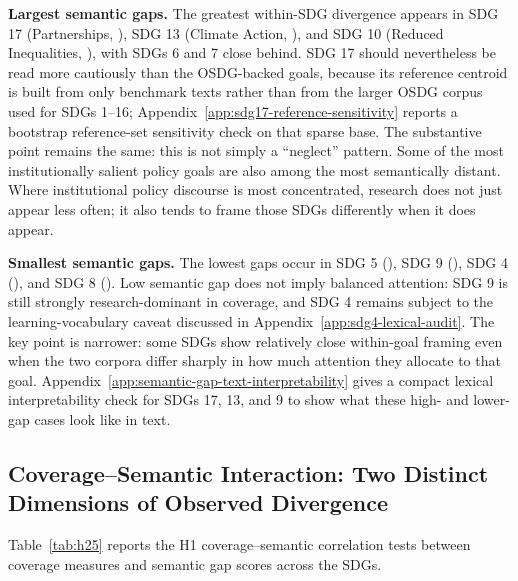 \documentclass[12pt,a4paper]{article}
\begin{document}
\textbf{Largest semantic gaps.} The greatest within-SDG divergence appears in SDG 17 (Partnerships, \SemanticGapSdgSeventeen), SDG 13 (Climate Action, \SemanticGapSdgThirteen), and SDG 10 (Reduced Inequalities, \SemanticGapSdgTen), with SDGs 6 and 7 close behind. SDG 17 should nevertheless be read more cautiously than the OSDG-backed goals, because its reference centroid is built from only \SdgSeventeenBenchmarkN{} benchmark texts rather than from the larger OSDG corpus used for SDGs 1--16; Appendix~\ref{app:sdg17-reference-sensitivity} reports a bootstrap reference-set sensitivity check on that sparse base. The substantive point remains the same: this is not simply a ``neglect'' pattern. Some of the most institutionally salient policy goals are also among the most semantically distant. Where institutional policy discourse is most concentrated, research does not just appear less often; it also tends to frame those SDGs differently when it does appear.

\textbf{Smallest semantic gaps.} The lowest gaps occur in SDG 5 (\SemanticGapSdgFive), SDG 9 (\SemanticGapSdgNine), SDG 4 (\SemanticGapSdgFour), and SDG 8 (\SemanticGapSdgEight). Low semantic gap does not imply balanced attention: SDG 9 is still strongly research-dominant in coverage, and SDG 4 remains subject to the learning-vocabulary caveat discussed in Appendix~\ref{app:sdg4-lexical-audit}. The key point is narrower: some SDGs show relatively close within-goal framing even when the two corpora differ sharply in how much attention they allocate to that goal. Appendix~\ref{app:semantic-gap-text-interpretability} gives a compact lexical interpretability check for SDGs 17, 13, and 9 to show what these high- and lower-gap cases look like in text.

\subsection{Coverage--Semantic Interaction: Two Distinct Dimensions of Observed Divergence}

Table~\ref{tab:h25} reports the H1 coverage–semantic correlation tests between coverage measures and semantic gap scores across the SDGs.

\begin{table}[ht]
\centering
\caption{H1 coverage–semantic correlation tests: research coverage proportion vs.\ semantic gap, across 17 SDGs.}
\label{tab:h25}

\end{table}
\end{document}
